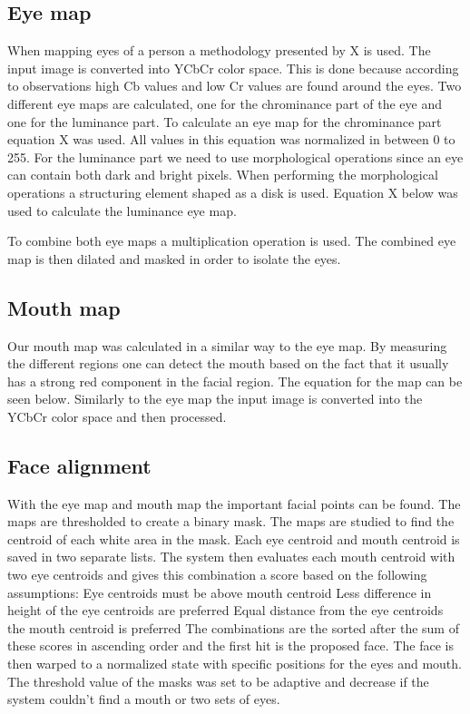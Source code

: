 \subsection{Eye map}
When mapping eyes of a person a methodology presented by X is used. The input image is converted into YCbCr color space. This is done because according to observations high Cb values and low Cr values are found around the eyes. Two different eye maps are calculated, one for the chrominance part of the eye and one for the luminance part. To calculate an eye map for the chrominance part equation X was used. All values in this equation was normalized in between 0 to 255. For the luminance part we need to use morphological operations since an eye can contain both dark and bright pixels. When performing the morphological operations a structuring element shaped as a disk is used. Equation X below was used to calculate the luminance eye map.

To combine both eye maps a multiplication operation is used. The combined eye map is then dilated and masked in order to isolate the eyes.

\subsection{Mouth map}
Our mouth map was calculated in a similar way to the eye map. By measuring the different regions one can detect the mouth based on the fact that it usually has a strong red component in the facial region. The equation for the map can be seen below. Similarly to the eye map the input image is converted into the YCbCr color space and then processed.

\subsection{Face alignment}
With the eye map and mouth map the important facial points can be found. The maps are thresholded to create a binary mask. The maps are studied to find the centroid of each white area in the mask. Each eye centroid and mouth centroid is saved in two separate lists. The system then evaluates each mouth centroid with two eye centroids and gives this combination a score based on the following assumptions:
Eye centroids must be above mouth centroid
Less difference in height of the eye centroids are preferred
Equal distance from the eye centroids  the mouth centroid is preferred
The combinations are the sorted after the sum of these scores in ascending order and the first hit is the proposed face. The face is then warped to a normalized state with specific positions for the eyes and mouth. The threshold value of the masks was set to be adaptive and decrease if the system couldn’t find a mouth or two sets of eyes.

